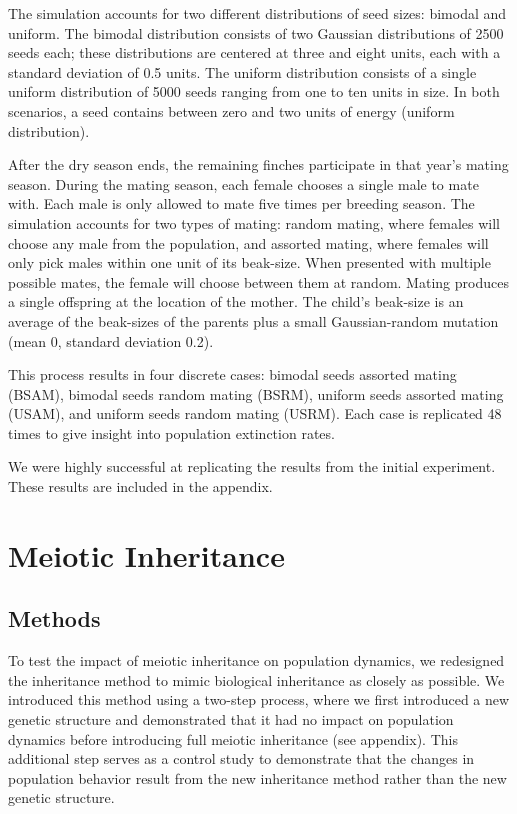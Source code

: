 \documentclass[conference]{IEEEtran}
\begin{document}
The simulation accounts for two different distributions of seed sizes: bimodal and uniform. The bimodal distribution consists of two Gaussian distributions of 2500 seeds each; these distributions are centered at three and eight units, each with a standard deviation of 0.5 units. The uniform distribution consists of a single uniform distribution of 5000 seeds ranging from one to ten units in size. In both scenarios, a seed contains between zero and two units of energy (uniform distribution).

After the dry season ends, the remaining finches participate in that year's mating season. During the mating season, each female chooses a single male to mate with. Each male is only allowed to mate five times per breeding season. The simulation accounts for two types of mating: random mating, where females will choose any male from the population, and assorted mating, where females will only pick males within one unit of its beak-size. When presented with multiple possible mates, the female will choose between them at random. Mating produces a single offspring at the location of the mother. The child’s beak-size is an average of the beak-sizes of the parents plus a small Gaussian-random mutation (mean 0, standard deviation 0.2).

This process results in four discrete cases: bimodal seeds assorted mating (BSAM), bimodal seeds random mating (BSRM), uniform seeds assorted mating (USAM), and uniform seeds random mating (USRM). Each case is replicated 48 times to give insight into population extinction rates. 

We were highly successful at replicating the results from the initial experiment. These results are included in the appendix. 



\section{Meiotic Inheritance}

\subsection{Methods}

To test the impact of meiotic inheritance on population dynamics, we redesigned the inheritance method to mimic biological inheritance as closely as possible. We introduced this method using a two-step process, where we first introduced a new genetic structure and demonstrated that it had no impact on population dynamics before introducing full meiotic inheritance (see appendix). This additional step serves as a control study to demonstrate that the changes in population behavior result from the new inheritance method rather than the new genetic structure.
\end{document}
